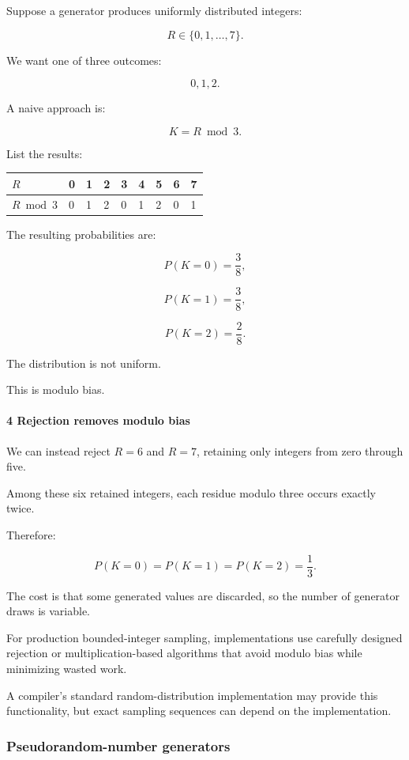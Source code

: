 Suppose a generator produces uniformly distributed integers:

\[
 R\in\{0,1,\ldots,7\}.
\]

We want one of three outcomes:

\[
 0,1,2.
\]

A naive approach is:

\[
 K=R\bmod3.
\]

List the results:

{\def\LTcaptype{none} %
\begin{longtable}[]{@{}lllllllll@{}}
\toprule\noalign{}
\(R\) & 0 & 1 & 2 & 3 & 4 & 5 & 6 & 7 \\
\midrule\noalign{}
\endhead
\bottomrule\noalign{}
\endlastfoot
\(R\bmod3\) & 0 & 1 & 2 & 0 & 1 & 2 & 0 & 1 \\
\end{longtable}
}

The resulting probabilities are:

\[
 P(K=0)=\frac38,
\]

\[
 P(K=1)=\frac38,
\]

\[
 P(K=2)=\frac28.
\]

The distribution is not uniform.

This is modulo bias.

\paragraph{4 Rejection removes modulo bias}\label{rejection-removes-modulo-bias}

We can instead reject \(R=6\) and \(R=7\), retaining only integers from zero through five.

Among these six retained integers, each residue modulo three occurs exactly twice.

Therefore:

\[
 P(K=0)=P(K=1)=P(K=2)=\frac13.
\]

The cost is that some generated values are discarded, so the number of generator draws is variable.

For production bounded-integer sampling, implementations use carefully designed rejection or multiplication-based algorithms that avoid modulo bias while minimizing wasted work.

A compiler's standard random-distribution implementation may provide this functionality, but exact sampling sequences can depend on the implementation.

\subsubsection{Pseudorandom-number generators}\label{pseudorandom-number-generators}

